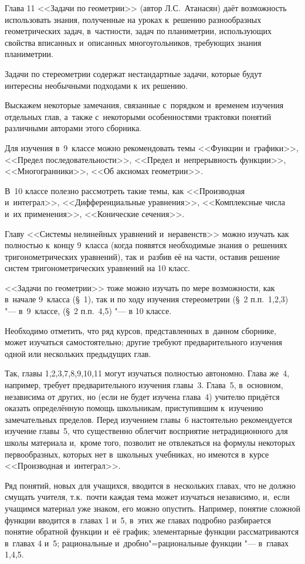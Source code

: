 Глава 11 <<Задачи по геометрии>> (автор Л.С.~Атанасян) даёт возможность
использовать знания, полученные на уроках к~решению разнообразных
геометрических задач, в~частности, задач по планиметрии, использующих свойства
вписанных и~описанных многоугольников, требующих знания планиметрии.

Задачи по стереометрии содержат нестандартные задачи, которые будут
интересны необычными подходами к~их решению.

Выскажем некоторые замечания, связанные с~порядком и~временем изучения
отдельных глав, а~также с~некоторыми особенностями трактовки понятий
различными авторами этого сборника.

Для изучения в~9~классе можно рекомендовать темы <<Функции и~графики>>,
<<Предел последовательности>>, <<Предел и~непрерывность функции>>,
<<Многогранники>>, <<Об аксиомах геометрии>>.

В~10 классе полезно рассмотреть такие темы, как <<Производная и~интеграл>>,
<<Дифференциальные уравнения>>, <<Комплексные числа и~их применения>>,
<<Конические сечения>>.

Главу <<Системы нелинейных уравнений и~неравенств>> можно изучать
как полностью к~концу 9~класса (когда появятся необходимые знания
о~решениях тригонометрических уравнений), так и~разбив её на части,
оставив решение систем тригонометрических уравнений на 10 класс.

<<Задачи по геометрии>> тоже можно изучать по мере возможности,
как в~начале 9~класса (\S~1), так и по ходу изучения стереометрии
(\S~2 п.п.~1,2,3) "--- в~9~классе, (\S~2 п.п.~4,5) "--- 
в 10 классе.

Необходимо отметить, что ряд курсов, представленных в~данном сборнике,
может изучаться самостоятельно; другие требуют предварительного
изучения одной или нескольких предыдущих глав.

Так, главы 1,2,3,7,8,9,10,11 могут изучаться полностью автономно.
Глава же~4, например, требует предварительного изучения главы~3.
Глава~5, в~основном, независима от других, но (если не будет изучена глава~4)
учителю придётся оказать определённую помощь школьникам, приступившим
к~изучению замечательных пределов. Перед изучением главы~6 настоятельно
рекомендуется изучение главы~5, что существенно облегчит восприятие
нетрадиционного для школы материала и,~кроме того, позволит не отвлекаться
на формулы некоторых первообразных, которых нет в~школьных учебниках,
но имеются в~курсе <<Производная и~интеграл>>.

Ряд понятий, новых для учащихся, вводится в~нескольких главах, что не должно
смущать учителя, т.к.\ почти каждая тема может изучаться независимо,
и,~если учащимся материал уже знаком, его можно опустить. Например, понятие
сложной функции вводится в~главах 1 и~5, в~этих же главах подробно разбирается
понятие обратной функции и~её график; элементарные функции рассматриваются
в~главах 4 и~5; рациональные и~дробно"=рациональные функции
"--- в~главах 1,4,5.


